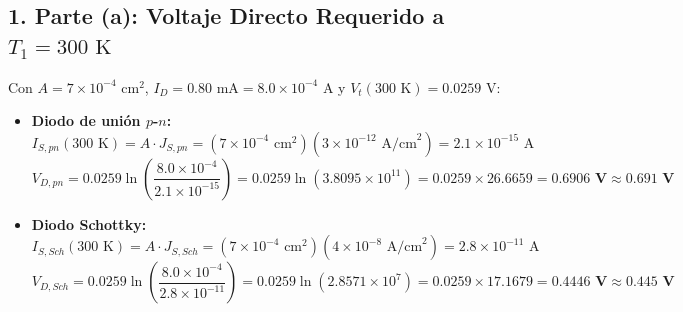 \documentclass[11pt,a4paper]{article}
\begin{document}
\subsection*{1. Parte (a): Voltaje Directo Requerido a $T_1 = 300\text{ K}$}
Con $A = 7 \times 10^{-4}\text{ cm}^2$, $I_D = 0.80\text{ mA} = 8.0 \times 10^{-4}\text{ A}$ y $V_t(300\text{ K}) = 0.0259\text{ V}$:
\begin{itemize}
    \item \textbf{Diodo de unión $p$-$n$:}
    \[
    I_{S,pn}(300\text{ K}) = A \cdot J_{S,pn} = (7 \times 10^{-4}\text{ cm}^2)(3 \times 10^{-12}\text{ A/cm}^2) = 2.1 \times 10^{-15}\text{ A}
    \]
    \[
    V_{D,pn} = 0.0259 \ln\left(\frac{8.0 \times 10^{-4}}{2.1 \times 10^{-15}}\right) = 0.0259 \ln(3.8095 \times 10^{11}) = 0.0259 \times 26.6659 = \mathbf{0.6906\text{ V} \approx 0.691\text{ V}}
    \]
    \item \textbf{Diodo Schottky:}
    \[
    I_{S,Sch}(300\text{ K}) = A \cdot J_{S,Sch} = (7 \times 10^{-4}\text{ cm}^2)(4 \times 10^{-8}\text{ A/cm}^2) = 2.8 \times 10^{-11}\text{ A}
    \]
    \[
    V_{D,Sch} = 0.0259 \ln\left(\frac{8.0 \times 10^{-4}}{2.8 \times 10^{-11}}\right) = 0.0259 \ln(2.8571 \times 10^7) = 0.0259 \times 17.1679 = \mathbf{0.4446\text{ V} \approx 0.445\text{ V}}
    \]
\end{itemize}
\end{document}
